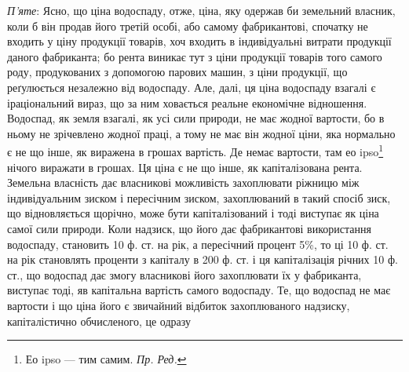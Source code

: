 \emph{П’яте}: Ясно, що ціна водоспаду, отже, ціна, яку одержав би земельний
власник, коли б він продав його третій особі, або самому фабрикантові,
спочатку не входить у ціну продукції товарів, хоч входить в індивідуальні
витрати продукції даного фабриканта; бо рента виникає тут з ціни продукції
товарів того самого роду, продукованих з допомогою парових машин,
з ціни продукції, що реґулюється незалежно від водоспаду. Але, далі, ця ціна
водоспаду взагалі є іраціональний вираз, що за ним ховається реальне економічне
відношення. Водоспад, як земля взагалі, як усі сили природи, не має
жодної вартости, бо в ньому не зрічевлено жодної праці, а тому не має він
жодної ціни, яка нормально є не що інше, як виражена в грошах вартість.
Де немає вартости, там ео ipso\footnote*{
Ео ipso — тим самим. \emph{Пр. Ред.}
} нічого виражати в грошах. Ця ціна є не
що інше, як капіталізована рента. Земельна власність дає власникові можливість
захоплювати ріжницю між індивідуальним зиском і пересічним зиском,
захоплюваний в такий спосіб зиск, що відновляється щорічно, може бути капіталізований
і тоді виступає як ціна самої сили природи. Коли надзиск, що
його дає фабрикантові використання водоспаду, становить 10 ф. ст. на рік, а
пересічний процент 5\%, то ці 10 ф. ст. на рік становлять проценти з капіталу в
200 ф. ст. і ця капіталізація річних 10 ф. ст., що водоспад дає змогу власникові
його захоплювати їх у фабриканта, виступає тоді, яв капітальна вартість самого
водоспаду. Те, що водоспад не має вартости і що ціна його є звичайний
відбиток захоплюваного надзиску, капіталістично обчисленого, це одразу
\parbreak{}  %
